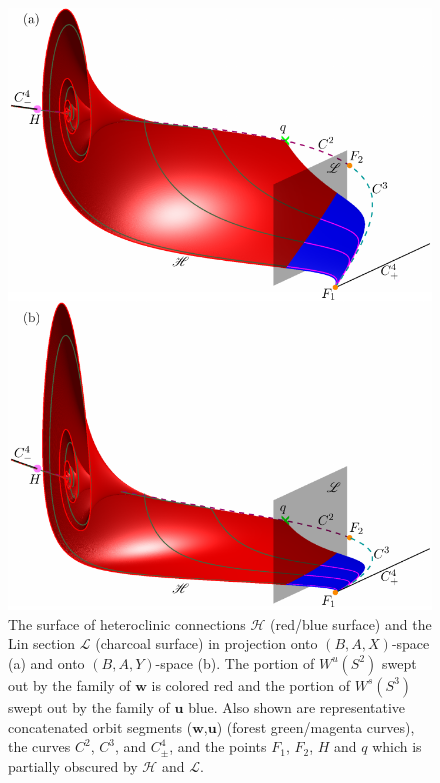 \documentclass{ws-ijbc}
\begin{document}
\begin{figure}[H]
\centering
\includegraphics[]{./figures/MKMO_11.pdf}
\caption{The surface of heteroclinic connections $\mathscr{H}$ (red/blue surface) and the Lin section $\mathscr{L}$ (charcoal surface) in projection onto $(B,A,X)$-space (a) and onto $(B,A,Y)$-space (b).  The portion of $W^u(S^2)$ swept out by the family of $\mathbf{w}$ is colored red and the portion of $W^s(S^3)$ swept out by the family of $\mathbf{u}$ blue.  Also shown are representative concatenated orbit segments ($\mathbf{w}$,$\mathbf{u}$) (forest green/magenta curves), the curves $C^2$, $C^3$, and $C^4_\pm$, and the points $F_1$, $F_2$, $H$ and $q$ which is partially obscured by $\mathscr{H}$ and $\mathscr{L}$.}
\label{figure_11}
\end{figure}
\end{document}
